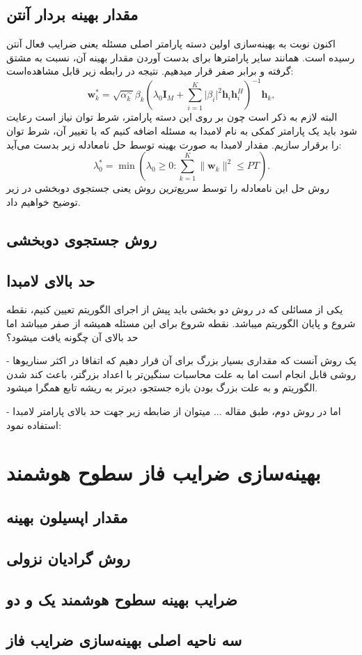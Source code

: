 \subsection{مقدار بهینه بردار آنتن}
اکنون نوبت به بهینه‌سازی اولین دسته پارامتر اصلی مسئله یعنی ضرایب فعال آنتن رسیده است. همانند سایر پارامترها برای بدست آوردن مقدار بهینه آن، نسبت به  مشتق گرفته و برابر صفر قرار میدهیم. نتیجه در رابطه زیر قابل مشاهده‌است:
\[\mathbf{w}_k^* = \sqrt{\alpha_k^\sim} \beta_k \left( \lambda_0 \mathbf{I}_M + \sum_{i=1}^{K} \lvert \beta_i \rvert^2 \mathbf{h}_i \mathbf{h}_i^H \right)^{-1} \mathbf{h}_k,
\]
البته لازم به ذکر است چون بر روی این دسته پارامتر، شرط توان نیاز است رعایت شود باید یک پارامتر کمکی به نام لامبدا به مسئله اضافه کنیم که با تغییر آن، شرط توان را برقرار سازیم.
مقدار لامبدا به صورت بهینه توسط حل نامعادله زیر بدست می‌آید:
\[
\lambda_0^* = \min \left( \lambda_0 \geq 0 : \sum_{k=1}^{K} \lVert \mathbf{w}_k \rVert^2 \leq PT \right).
\]
روش حل این نامعادله را توسط سریع‌ترین روش یعنی جستجوی دوبخشی در زیر توضیح خواهیم داد. 
\subsection{روش جستجوی دوبخشی}

\subsection{حد بالای لامبدا}
یکی از مسائلی که در روش دو بخشی باید پیش از اجرای الگوریتم تعیین کنیم، نقطه شروع و پایان الگوریتم میباشد. نقطه شروع برای این مسئله همیشه از صفر میباشد اما حد بالای آن چگونه یافت میشود؟

- یک روش آنست که مقداری بسیار بزرگ برای آن قرار دهیم که اتفاقا در اکثر سناریوها روشی قابل انجام است اما به علت محاسبات سنگین‌تر با اعداد بزرگتر، باعث کند شدن الگوریتم و به علت بزرگ‌ بودن بازه جستجو، دیرتر به ریشه تابع همگرا میشود.

- اما در روش دوم، طبق مقاله ... میتوان از ضابطه زیر جهت حد بالای پارامتر لامبدا استفاده نمود:

\section{بهینه‌سازی ضرایب فاز سطوح هوشمند}

\subsection{مقدار اپسیلون بهینه}

\subsection{روش گرادیان نزولی}

\subsection{ضرایب بهینه سطوح هوشمند یک و دو}

\subsection{سه ناحیه اصلی بهینه‌سازی ضرایب فاز}

\newpage
‌
